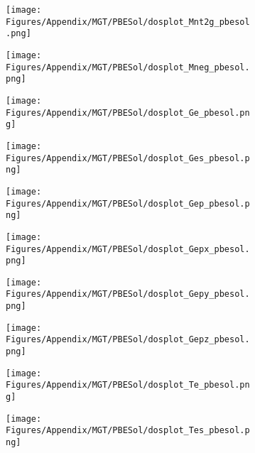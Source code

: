 \begin{figure}[H]
\hfill
\begin{subfigure}{0.24\textwidth}
    \texttt{[image: Figures/Appendix/MGT/PBESol/dosplot\_Mnt2g\_pbesol.png]}
    \label{dosplot_Mnt2g_pbesol}
\end{subfigure}
\hfill
\begin{subfigure}{0.24\textwidth}
    \texttt{[image: Figures/Appendix/MGT/PBESol/dosplot\_Mneg\_pbesol.png]}
    \label{dosplot_Mneg_pbesol}
\end{subfigure}
\hfill
\begin{subfigure}{0.24\textwidth}
    \texttt{[image: Figures/Appendix/MGT/PBESol/dosplot\_Ge\_pbesol.png]}
    \label{dosplot_MnGe_pbesol}
\end{subfigure}
\hfill
\begin{subfigure}{0.24\textwidth}
    \texttt{[image: Figures/Appendix/MGT/PBESol/dosplot\_Ges\_pbesol.png]}
    \label{dosplot_MnGes_pbesol}
\end{subfigure}
\hfill
\begin{subfigure}{0.24\textwidth}
    \texttt{[image: Figures/Appendix/MGT/PBESol/dosplot\_Gep\_pbesol.png]}
    \label{dosplot_MnGep_pbesol}
\end{subfigure}
\hfill
\begin{subfigure}{0.24\textwidth}
    \texttt{[image: Figures/Appendix/MGT/PBESol/dosplot\_Gepx\_pbesol.png]}
    \label{dosplot_MnGepx_pbesol}
\end{subfigure}
\hfill
\begin{subfigure}{0.24\textwidth}
    \texttt{[image: Figures/Appendix/MGT/PBESol/dosplot\_Gepy\_pbesol.png]}
    \label{dosplot_MnGepy_pbesol}
\end{subfigure}
\hfill
\begin{subfigure}{0.24\textwidth}
    \texttt{[image: Figures/Appendix/MGT/PBESol/dosplot\_Gepz\_pbesol.png]}
    \label{dosplot_MnGepz_pbesol}
\end{subfigure}
\hfill
\begin{subfigure}{0.24\textwidth}
    \texttt{[image: Figures/Appendix/MGT/PBESol/dosplot\_Te\_pbesol.png]}
    \label{dosplot_MnTe_pbesol}
\end{subfigure}
\hfill
\begin{subfigure}{0.24\textwidth}
    \texttt{[image: Figures/Appendix/MGT/PBESol/dosplot\_Tes\_pbesol.png]}
    \label{dosplot_MnTes_pbesol}
\end{subfigure}

\end{figure}
